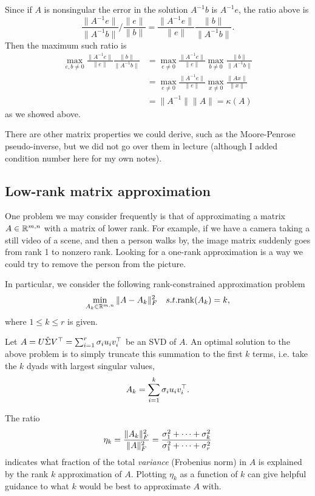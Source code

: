 \documentclass[11 pt]{scrartcl}
\begin{document}
Since if $A$ is nonsingular the error in the solution $A^{-1} b$ is $A^{-1} e$, the ratio above is 
\[ \frac{\|A^{-1}e\|}{\|A^{-1} b\|} / \frac{\|e\|}{\|b\|} = \frac{\|A^{-1} e\|}{\|e\|} \frac{\|b\|}{\|A^{-1} b\|}.\] 
Then the maximum such ratio is 
\begin{align*}
    \max_{e,b\not= 0} \frac{\|A^{-1} e\|}{\|e\|} \frac{\|b\|}{\|A^{-1} b\|} &= \max_{e\not=0} \frac{\|A^{-1} e\|}{\|e\|} \max_{b\not= 0}\frac{\|b\|}{\|A^{-1} b\|} \\ 
                                                                            &= \max_{e\not=0}  \frac{\|A^{-1} e\|}{\|e\|}\max_{x\not= 0}\frac{\|Ax\|}{\|x\|} \\ 
                                                                            &= \|A^{-1}\| \|A\| = \kappa(A)
\end{align*}
as we showed above.

There are other matrix properties we could derive, such as the Moore-Penrose pseudo-inverse, but we did not go over them in lecture (although I added condition number here for my own notes).

\subsection{Low-rank matrix approximation}
One problem we may consider frequently is that of approximating a matrix $A\in \mathbb R^{m,n}$ with a matrix of lower rank. 
For example, if we have a camera taking a still video of a scene, and then a person walks by, the image matrix suddenly goes from rank 1 to nonzero rank. 
Looking for a one-rank approximation is a way we could try to remove the person from the picture. 

In particular, we consider the following rank-constrained approximation problem 
\[ \min_{A_k\in \mathbb R^{m,n}} \|A-A_k\|_F^2\quad s.t. \text{rank} (A_k) = k,\] 
where $1\leq k \leq r$ is given. 

Let $A = U\tilde{\Sigma} V^\top = \sum_{i=1}^r \sigma_i u_i v_i^\top$ be an SVD of $A$. 
An optimal solution to the above problem is to simply truncate this summation to the first $k$ terms, i.e. take the $k$ dyads with largest singular values, 
\[A_k = \sum_{i=1}^k \sigma_i u_i v_i^\top.\] 

The ratio 
\[ \eta_k = \dfrac{\|A_k\|_F^2}{\|A\|_F^2} = \dfrac{\sigma_1^2+\dots + \sigma_k^2}{\sigma_1^2 + \dots + \sigma_r^2}\] 
indicates what fraction of the total \emph{variance} (Frobenius norm) in $A$ is explained by the rank $k$ approximation of $A$. 
Plotting $\eta_k$ as a function of $k$ can give helpful guidance to what $k$ would be best to approximate $A$ with. 
\end{document}
